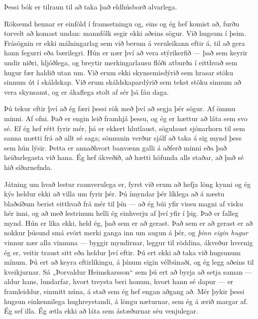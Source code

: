 Þessi bók er tilraun til að taka það eldhúsborð alvarlega.

Röksemd hennar er einföld í framsetningu og, eins og ég hef komist að, furðu torvelt að komast undan: mannfólk segir ekki aðeins sögur. Við hugsum í þeim. Frásögnin er ekki málningarlag sem við berum á veruleikann eftir á, til að gera hann fegurri eða bærilegri. Hún er nær því að vera stýrikerfið — það sem keyrir undir niðri, hljóðlega, og breytir merkingarlausu flóði atburða í eitthvað sem hugur fær haldið utan um. Við erum ekki skynsemisdýrið sem hrasar stöku sinnum út í skáldskap. Við erum skáldskapardýrið sem tekst stöku sinnum að vera skynsamt, og er ákaflega stolt af sér þá fáu daga.

Þú tekur eftir því að ég færi þessi rök með því að segja þér sögur. Af ömmu minni. Af ofni. Það er engin leið framhjá þessu, og ég er hættur að láta sem svo sé. Ef ég hef rétt fyrir mér, þá er ekkert hlutlaust, sögulaust sjónarhorn til sem sanna mætti frá að allt sé saga; sönnunin verður sjálf að taka á sig mynd þess sem hún lýsir. Þetta er annaðhvort banvænn galli á aðferð minni eða það heiðarlegasta við hana. Ég hef ákveðið, að hætti höfunda alls staðar, að það sé hið síðarnefnda.

Játning um hvað lestur raunverulega er, fyrst við erum að hefja löng kynni og ég kýs heldur ekki að villa um fyrir þér. Þú ímyndar þér líklega að á næstu blaðsíðum berist eitthvað frá mér til þín — að ég búi yfir vissu magni af visku hér inni, og að með lestrinum helli ég einhverju af því yfir í þig. Það er falleg mynd. Hún er líka ekki, held ég, það sem er að gerast. Það sem er að gerast er að nokkur þúsund smá svört merki ganga inn um augun á þér, og \emph{þinn eigin hugur} vinnur nær alla vinnuna — byggir myndirnar, leggur til röddina, ákveður hvernig ég er, veitir traust sitt eða heldur því eftir. Þú ert ekki að taka við hugsunum mínum. Þú ert að keyra eftirlíkingu, á þínum eigin vélbúnaði, og ég legg aðeins til kveikjurnar. Sá „Þorvaldur Heimskarsson“ sem þú ert að byrja að setja saman — aldur hans, lundarfar, hvort treysta beri honum, hvort hann sé dapur — er framleiddur, einmitt núna, á stað sem ég hef engan aðgang að. Mér þykir þessi hugsun einkennilega hughreystandi, á löngu næturnar, sem ég á ærið margar af. Ég sef illa. Ég ætla ekki að láta sem ástæðurnar séu venjulegar.

